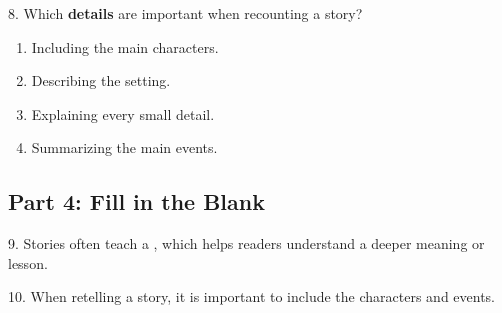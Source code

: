 \documentclass[12pt]{article}
\begin{document}
\vspace{1cm}

8. Which \textbf{details} are important when recounting a story?\\
\begin{enumerate}[label=\Alph*.]
    \item Including the main characters.  
    \item Describing the setting.  
    \item Explaining every small detail.  
    \item Summarizing the main events.  
\end{enumerate}

\vspace{1cm}
\subsection*{Part 4: Fill in the Blank}

9. Stories often teach a \underline{\hspace{4cm}}, which helps readers understand a deeper meaning or lesson.

\vspace{1cm}

10. When retelling a story, it is important to include the \underline{\hspace{4cm}} characters and events.





\end{document}
